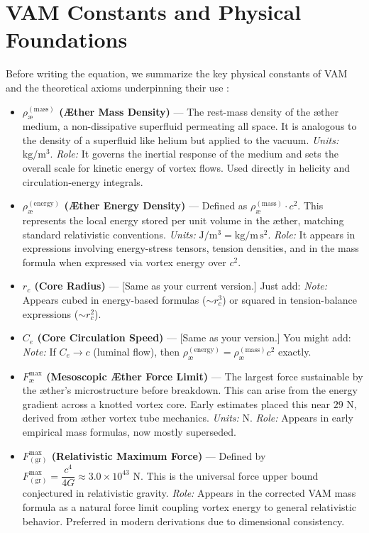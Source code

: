     \bigskip

    \section{VAM Constants and Physical Foundations}

    Before writing the equation, we summarize the key physical constants of VAM and the theoretical axioms underpinning their use \cite{Iskandarani2025a,Iskandarani2025b}:

\begin{itemize}
    \item \textbf{$\rho_{\text{\ae}}^{(\mathrm{mass})}$ (Æther Mass Density)} — The rest-mass density of the æther medium, a non-dissipative superfluid permeating all space. It is analogous to the density of a superfluid like helium but applied to the vacuum. \textit{Units:} $\mathrm{kg/m^3}$. \textit{Role:} It governs the inertial response of the medium and sets the overall scale for kinetic energy of vortex flows. Used directly in helicity and circulation-energy integrals.

    \item \textbf{$\rho_{\text{\ae}}^{(\mathrm{energy})}$ (Æther Energy Density)} — Defined as $\rho_{\text{\ae}}^{(\mathrm{mass})} \cdot c^2$. This represents the local energy stored per unit volume in the æther, matching standard relativistic conventions. \textit{Units:} $\mathrm{J/m^3} = \mathrm{kg/m\,s^2}$. \textit{Role:} It appears in expressions involving energy-stress tensors, tension densities, and in the mass formula when expressed via vortex energy over $c^2$.

    \item \textbf{$r_c$ (Core Radius)} — [Same as your current version.] Just add: \textit{Note:} Appears cubed in energy-based formulas ($\sim r_c^3$) or squared in tension-balance expressions ($\sim r_c^2$).

    \item \textbf{$C_e$ (Core Circulation Speed)} — [Same as your version.] You might add: \textit{Note:} If $C_e \to c$ (luminal flow), then $\rho_{\text{\ae}}^{(\mathrm{energy})} = \rho_{\text{\ae}}^{(\mathrm{mass})} c^2$ exactly.

    \item \textbf{$F^{\max}_{\text{\ae}}$ (Mesoscopic Æther Force Limit)} — The largest force sustainable by the æther's microstructure before breakdown. This can arise from the energy gradient across a knotted vortex core. Early estimates placed this near $29$ N, derived from æther vortex tube mechanics. \textit{Units:} N. \textit{Role:} Appears in early empirical mass formulas, now mostly superseded.

    \item \textbf{$F^{\max}_{(\mathrm{gr})}$ (Relativistic Maximum Force)} — Defined by $F^{\max}_{(\mathrm{gr})} = \dfrac{c^4}{4G} \approx 3.0 \times 10^{43}$ N. This is the universal force upper bound conjectured in relativistic gravity. \textit{Role:} Appears in the corrected VAM mass formula as a natural force limit coupling vortex energy to general relativistic behavior. Preferred in modern derivations due to dimensional consistency.
\end{itemize}


